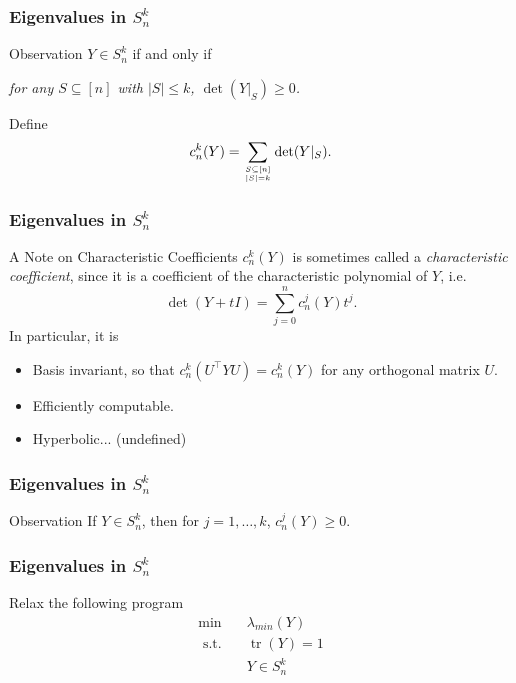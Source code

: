 \documentclass{beamer}
\DeclareMathOperator{\tr}{tr}
\newcommand{\st}{{\text{ s.t. }}}
\renewcommand\top[2]{\genfrac{}{}{0pt}{}{#1}{#2}}
\begin{document}
\begin{frame}
    \frametitle{Eigenvalues in $S^k_n$}
    \begin{block}{Observation}
        $Y \in S^k_n$ if and only if

        \hspace{0.25in} \emph{for any $S \subseteq [n]$ with $|S| \le k$, $\det(Y|_S) \ge 0$.}
    \end{block}
    \pause 
    Define 
    \[
        c_n^k(Y) = \sum_{\top{S \subseteq [n]}{|S| = k}}  \det(Y|_S).
    \]
\end{frame}
\begin{frame}
    \frametitle{Eigenvalues in $S^k_n$}
    \begin{block}{A Note on Characteristic Coefficients}
        $c_n^k(Y)$ is sometimes called a \emph{characteristic coefficient}, since it is a coefficient of the characteristic polynomial of $Y$, i.e.
        \[
            \det(Y + tI) = \sum_{j=0}^n c_n^j(Y) t^j.
        \]
        \pause
        In particular, it is
        \begin{itemize}
            \item Basis invariant, so that $c_n^k(U^{\intercal} Y U) = c_n^k(Y)$ for any orthogonal matrix $U$.
            \pause
            \item Efficiently computable.
            \pause
            \item Hyperbolic... (undefined)
        \end{itemize}
    \end{block}
\end{frame}
\begin{frame}
    \frametitle{Eigenvalues in $S^k_n$}
    \begin{block}{Observation}
        If $Y \in S^k_n$, then for $j = 1 ,\dots, k$, $c_n^j(Y) \ge 0$.
    \end{block}
\end{frame}
\begin{frame}
    \frametitle{Eigenvalues in $S^k_n$}
    Relax the following program
    \begin{equation}
        \begin{aligned}
            \min\quad & \lambda_{min}(Y)\\
            \st & \tr(Y) = 1\\
                & Y \in S^k_n\\
        \end{aligned}
    \end{equation}
\end{frame}
\end{document}
